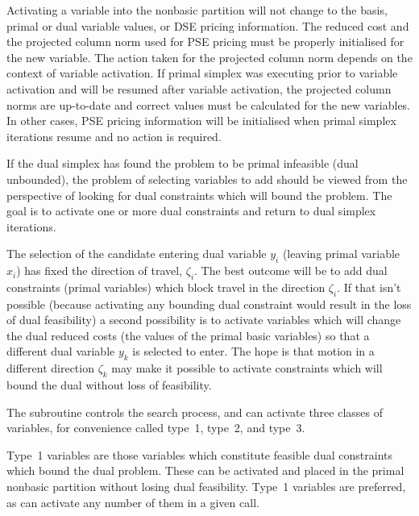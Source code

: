 Activating a variable into the nonbasic partition
will not change to the basis, primal or dual variable values, or DSE pricing
information.
The reduced cost and the projected column norm used for PSE pricing must
be properly initialised for the new variable.
The action taken for the projected column norm depends on the context of
variable activation.
If primal simplex was executing prior to variable activation and will
be resumed after variable activation, the projected column norms are
up-to-date and correct values must be calculated for the new variables.
In other cases, PSE pricing information will be initialised when
primal simplex iterations resume and no action is required.

If the dual simplex has found the problem to be primal infeasible (dual
unbounded), the problem of selecting variables to add should be viewed
from the perspective of looking for dual constraints which will bound
the problem.
The goal is to activate one or more dual constraints and return to
dual simplex iterations.

The selection of the candidate entering dual variable $y_i$ (leaving primal
variable $x_i$) has fixed the direction of travel, $\zeta_i$.
The best outcome will be to add dual constraints (primal variables) which
block travel in the direction $\zeta_i$.
If that isn't possible (because activating any bounding dual constraint would
result in the loss of dual feasibility) a second possibility is to activate
variables which will change the dual reduced costs (the values of the primal
basic variables) so that a different dual variable $y_k$ is selected to enter.
The hope is that motion in a different direction $\zeta_k$ may make it
possible to activate constraints which will bound the dual without loss of
feasibility.

The subroutine  controls the search process, and can
activate three classes of variables, for convenience called type~1, type~2,
and type~3.

Type~1 variables are those variables which constitute feasible dual
constraints which bound the dual problem.
These can be activated and placed in the primal nonbasic partition without
losing dual feasibility.
Type~1 variables are preferred, as  can activate any
number of them in a given call.

